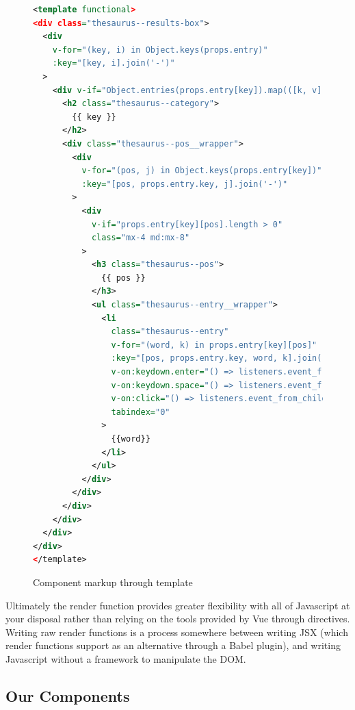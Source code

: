 \documentclass[11pt, twoside, reqno]{book}
\begin{document}
\begin{figure}
\footnotesize{
\begin{lstlisting}[language=XML]
<template functional>
<div class="thesaurus--results-box">
  <div 
    v-for="(key, i) in Object.keys(props.entry)" 
    :key="[key, i].join('-')"
  >
    <div v-if="Object.entries(props.entry[key]).map(([k, v]) => v.length > 0).reduce((a, c) => (a || c))">
      <h2 class="thesaurus--category">
        {{ key }}
      </h2>
      <div class="thesaurus--pos__wrapper">
        <div 
          v-for="(pos, j) in Object.keys(props.entry[key])" 
          :key="[pos, props.entry.key, j].join('-')"
        >
          <div 
            v-if="props.entry[key][pos].length > 0" 
            class="mx-4 md:mx-8"
          >
            <h3 class="thesaurus--pos">
              {{ pos }}
            </h3>
            <ul class="thesaurus--entry__wrapper">
              <li 
                class="thesaurus--entry" 
                v-for="(word, k) in props.entry[key][pos]" 
                :key="[pos, props.entry.key, word, k].join('-')" 
                v-on:keydown.enter="() => listeners.event_from_child(word)" 
                v-on:keydown.space="() => listeners.event_from_child(word)" 
                v-on:click="() => listeners.event_from_child(word)" 
                tabindex="0"
              >
                {{word}}
              </li>
            </ul>
          </div>
        </div>
      </div>
    </div>
  </div>
</div>
</template>
\end{lstlisting}
}
\caption{Component markup through template}
\label{fig:template}
\end{figure}

Ultimately the render function provides greater flexibility with all of Javascript at your disposal rather than relying on the tools provided by Vue through directives. Writing raw render functions is a process somewhere between writing JSX (which render functions support as an alternative through a Babel plugin), and writing Javascript without a framework to manipulate the DOM.

\subsection{Our Components}
\end{document}

